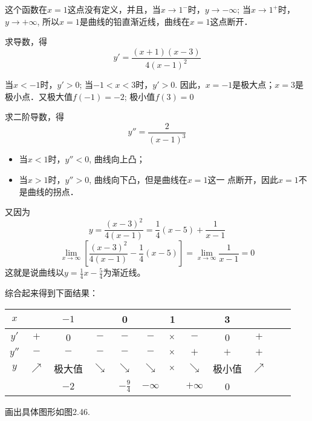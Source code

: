     \begin{solution}
        这个函数在$x=1$这点没有定义，并且，当$x\to 1^-$时，$y\to -\infty$; 当$x\to 1^+$时，$y\to +\infty$, 所以$x=1$是曲线的铅直渐近线，曲线在$x=1$这点断开．
        
    求导数，得
    \[y'= \frac{(x+1) (x-3)}{4 (x-1)^2}\]
    
    当$x<-1$时，$y'>0$; 当$-1<x<3$时，$y'>0$. 因此，$x=-1$是极大点；$x=3$是极小点．又极大值$f(-1)=-2$; 极小值$f(3)=0$
    
    求二阶导数，得
    \[y''=\frac{2}{(x-1)^3}\]
    \begin{itemize}
        \item 当$x<1$时，$y''<0$, 曲线向上凸；
        \item 当$x>1$时，$y''>0$, 曲线向下凸，但是曲线在$x=1$这一
        点断开，因此$x=1$不是曲线的拐点．
    \end{itemize}
    
    又因为
    \[y=\frac{(x-3)^2}{4(x-1)}=\frac{1}{4}(x-5)+\frac{1}{x-1}\]
    \[\lim_{x\to \infty}\left[\frac{(x-3)^2}{4(x-1)}-\frac{1}{4}(x-5)\right]=\lim_{x\to\infty}\frac{1}{x-1}=0\]
    这就是说曲线以$y=\frac{1}{4}x-\frac{5}{4}$为渐近线。
    
    综合起来得到下面结果：
    \begin{center}
        \begin{tabular}{cccccccccccc}
        \hline
        $x$ & &$-1$&&0&&1&&3&\\
        \hline
        $y'$& $+$ & 0&$-$&$-$&$-$&$\times$&$-$&0&$+$\\
        $y''$&$-$&$-$&$-$&$-$&$-$&$\times$&$+$&$+$&$+$\\
        $y$&$\nearrow$ &极大值& $\searrow$  & $\searrow$&$\searrow$ & $\times$& $\searrow$ & 极小值 & $\nearrow$  \\
        &  &$-2$&&$-\frac{9}{4}$&$-\infty $&&$+\infty$&0 &\\
        \hline
        \end{tabular}
        \end{center}
    
    画出具体图形如图2.46.
    \begin{figure}[htp]
        \centering
        \caption{}
    \end{figure}
    \end{solution}
    
